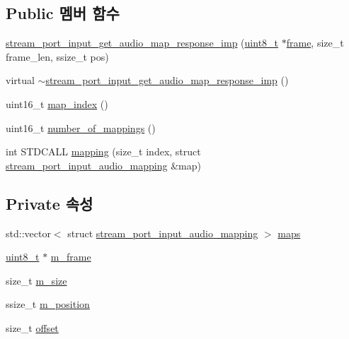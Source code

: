 \subsection*{Public 멤버 함수}
\begin{DoxyCompactItemize}
\item 
\hyperlink{classavdecc__lib_1_1stream__port__input__get__audio__map__response__imp_a97a338786c844fca5efb66258115b0f4}{stream\+\_\+port\+\_\+input\+\_\+get\+\_\+audio\+\_\+map\+\_\+response\+\_\+imp} (\hyperlink{stdint_8h_aba7bc1797add20fe3efdf37ced1182c5}{uint8\+\_\+t} $\ast$\hyperlink{gst__avb__playbin_8c_ac8e710e0b5e994c0545d75d69868c6f0}{frame}, size\+\_\+t frame\+\_\+len, ssize\+\_\+t pos)
\item 
virtual \hyperlink{classavdecc__lib_1_1stream__port__input__get__audio__map__response__imp_a8389324b3723d6f0282d9d84decd5fa8}{$\sim$stream\+\_\+port\+\_\+input\+\_\+get\+\_\+audio\+\_\+map\+\_\+response\+\_\+imp} ()
\item 
uint16\+\_\+t \hyperlink{classavdecc__lib_1_1stream__port__input__get__audio__map__response__imp_a2fdcf4d2f53407b6a6b165ec04b38b25}{map\+\_\+index} ()
\item 
uint16\+\_\+t \hyperlink{classavdecc__lib_1_1stream__port__input__get__audio__map__response__imp_a3928eb3903b4e082cbc7d6d29146aabd}{number\+\_\+of\+\_\+mappings} ()
\item 
int S\+T\+D\+C\+A\+LL \hyperlink{classavdecc__lib_1_1stream__port__input__get__audio__map__response__imp_a321531aa7d6c45b8f66b8552d9d35e11}{mapping} (size\+\_\+t index, struct \hyperlink{structavdecc__lib_1_1stream__port__input__audio__mapping}{stream\+\_\+port\+\_\+input\+\_\+audio\+\_\+mapping} \&map)
\end{DoxyCompactItemize}
\subsection*{Private 속성}
\begin{DoxyCompactItemize}
\item 
std\+::vector$<$ struct \hyperlink{structavdecc__lib_1_1stream__port__input__audio__mapping}{stream\+\_\+port\+\_\+input\+\_\+audio\+\_\+mapping} $>$ \hyperlink{classavdecc__lib_1_1stream__port__input__get__audio__map__response__imp_a08742edfc36f8b426cf39d4f7e89275a}{maps}
\item 
\hyperlink{stdint_8h_aba7bc1797add20fe3efdf37ced1182c5}{uint8\+\_\+t} $\ast$ \hyperlink{classavdecc__lib_1_1stream__port__input__get__audio__map__response__imp_a50417969cf438e7c8d698726bbbe2ff9}{m\+\_\+frame}
\item 
size\+\_\+t \hyperlink{classavdecc__lib_1_1stream__port__input__get__audio__map__response__imp_a0dc3c363255f193681c77b4d2a82e995}{m\+\_\+size}
\item 
ssize\+\_\+t \hyperlink{classavdecc__lib_1_1stream__port__input__get__audio__map__response__imp_af5e691c4a8a0feb07f48440b321206cd}{m\+\_\+position}
\item 
size\+\_\+t \hyperlink{classavdecc__lib_1_1stream__port__input__get__audio__map__response__imp_aadb6d6eb83e646653a1402032e45dcab}{offset}
\end{DoxyCompactItemize}



